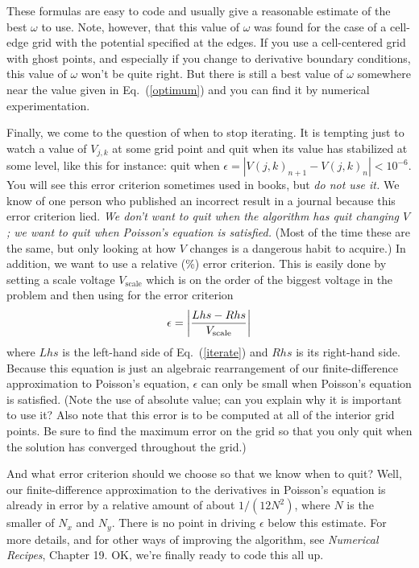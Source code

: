 These formulas are easy to code and usually give a reasonable
estimate of the best $\omega$ to use. Note, however, that this value
of $\omega$ was found for the case of a cell-edge grid with the
potential specified at the edges. If you use a cell-centered grid
with ghost points, and especially if you change to derivative
boundary conditions, this value of $\omega$ won't be quite right. But
there is still a best value of $\omega$ somewhere near the value
given in Eq.~(\ref{optimum}) and you can find it by numerical
experimentation.

Finally, we come to the question of when to stop iterating. It
is tempting just to watch a value of $V_{j,k}$ at some grid
point and quit when its value has stabilized at some level,
like this for instance: quit when $\epsilon = |
V(j,k)_{n+1}-V(j,k)_n| < 10^{-6}$. You will see this error
criterion sometimes used in books, but {\it do not use it.} We
know of one person who published an incorrect result in a
journal because this error criterion lied. {\it We don't want
to quit when the algorithm has quit changing $V$; we want to
quit when Poisson's equation is satisfied. } (Most of the time
these are the same, but only looking at how $V$ changes is a
dangerous habit to acquire.) In addition, we want to use a
relative (\%) error criterion. This is easily done by setting a
scale voltage $V_\mathrm{scale}$ which is on the order of the biggest
voltage in the problem and then using for the error criterion
\begin{equation}
    \epsilon = \left| {Lhs-Rhs \over V_\mathrm{scale}} \right|
\end{equation}
where $Lhs$ is the left-hand side of Eq.~(\ref{iterate}) and
$Rhs$ is its right-hand side. Because this equation is just an
algebraic rearrangement of our finite-difference approximation
to Poisson's equation, $\epsilon$ can only be small when
Poisson's equation is satisfied. (Note the use of absolute
value; can you explain why it is important to use it? Also note
that this error is to be computed at all of the interior grid
points. Be sure to find the maximum error on the grid so that
you only quit when the solution has converged throughout the
grid.)

And what error criterion should we choose so that we know when to
quit? Well, our finite-difference approximation to the derivatives in
Poisson's equation is already in error by a relative amount of about
$1/(12 N^2)$, where $N$ is the smaller of $N_x$ and $N_y$. There is
no point in driving $\epsilon$ below this estimate. For more details,
and for other ways of improving the algorithm, see {\it Numerical
Recipes}, Chapter 19. OK, we're finally ready to code this all up.

